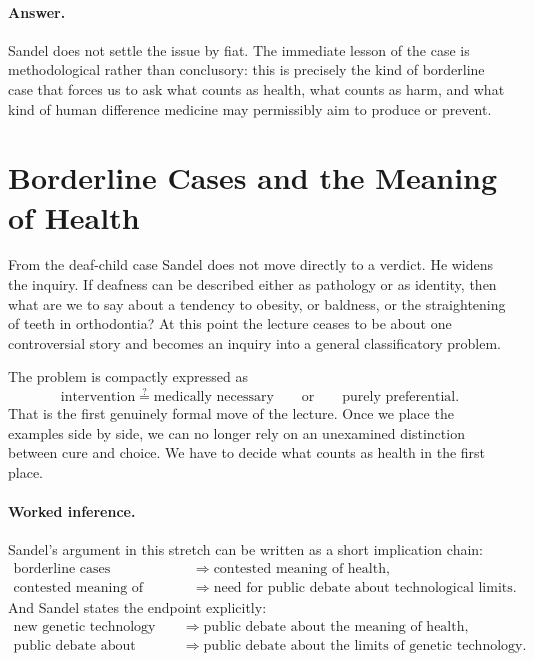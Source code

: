 \paragraph{Answer.} Sandel does not settle the issue by fiat. The immediate lesson of the case is methodological rather than conclusory: this is precisely the kind of borderline case that forces us to ask what counts as health, what counts as harm, and what kind of human difference medicine may permissibly aim to produce or prevent.

\section{Borderline Cases and the Meaning of Health}

From the deaf-child case Sandel does not move directly to a verdict. He widens the inquiry. If deafness can be described either as pathology or as identity, then what are we to say about a tendency to obesity, or baldness, or the straightening of teeth in orthodontia? At this point the lecture ceases to be about one controversial story and becomes an inquiry into a general classificatory problem.

The problem is compactly expressed as
\begin{equation}
\text{intervention}
\stackrel{?}{=}
\text{medically necessary}
\qquad \text{or} \qquad
\text{purely preferential}.
\end{equation}
That is the first genuinely formal move of the lecture. Once we place the examples side by side, we can no longer rely on an unexamined distinction between cure and choice. We have to decide what counts as health in the first place.

\paragraph{Worked inference.} Sandel's argument in this stretch can be written as a short implication chain:
\begin{align}
\text{borderline cases}
&\Longrightarrow
\text{contested meaning of health},\\
\text{contested meaning of health}
&\Longrightarrow
\text{need for public debate about technological limits}.
\end{align}
And Sandel states the endpoint explicitly:
\begin{align}
\text{new genetic technology}
&\Longrightarrow
\text{public debate about the meaning of health},\\
\text{public debate about health}
&\Longrightarrow
\text{public debate about the limits of genetic technology}.
\end{align}


